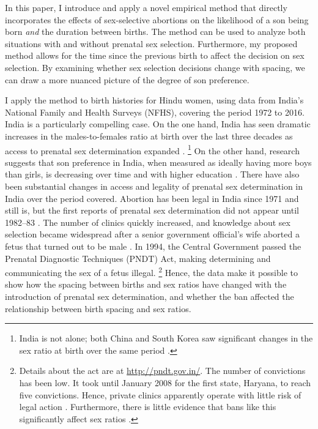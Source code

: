 \documentclass[12pt,letterpaper]{article}
\begin{document}
In this paper, I introduce and apply a novel empirical method that directly incorporates 
the effects of sex-selective abortions on the likelihood of a son being born 
\emph{and} the duration between births.
The method can be used to analyze both situations with and without prenatal
sex selection.
Furthermore, my proposed method allows for the time since the previous 
birth to affect the decision on sex selection.
By examining whether sex selection decisions change with spacing, we can 
draw a more nuanced picture of the degree of son preference.

I apply the method to birth histories for Hindu women, using data from 
India's National Family and Health Surveys (NFHS), covering the period 
1972 to 2016. 
India is a particularly compelling case.
On the one hand, India has seen dramatic increases in the males-to-females ratio 
at birth over the last three decades as access to prenatal sex determination 
expanded 
\citep{das_gupta97,Sudha1999,Arnold2002,retherford03b,jha06}.%
\footnote{
India is not alone; both China and South Korea saw
significant changes in the sex ratio at birth over the same period 
\citep{Yi1993,park95}.
}
On the other hand, research suggests that son preference in 
India, when measured as ideally having more boys than girls, is decreasing 
over time and with higher education \citep{bhat03,pande07}.
There have also been substantial changes in access and legality of
prenatal sex determination in India over the period covered.
Abortion has been legal in India since 1971 and still is, but the 
first reports of prenatal sex determination did
not appear until 1982--83 \citep{Sudha1999,bhat06,Grover2006}.
The number of clinics quickly increased, and knowledge about sex selection 
became widespread after a senior government official's wife aborted a 
fetus that turned out to be male \citep[p.\ 598]{Sudha1999}.
In 1994, the Central Government passed the Prenatal Diagnostic Techniques 
(PNDT) Act, making determining and communicating the sex of a fetus illegal.%
\footnote{
Details about the act are at \href{http://pndt.gov.in/}{http://pndt.gov.in/}.
The number of convictions has been low.
It took until January 2008 for the first state, Haryana, to reach five convictions.
Hence, private clinics apparently operate with little risk of legal action 
\citep{Sudha1999}.
Furthermore, there is little evidence that bans like this significantly
affect sex ratios \citep{Das-Gupta2016}.
}
Hence, the data make it possible to show how the spacing between births and
sex ratios have changed with the introduction of prenatal sex determination,
and whether the ban affected the relationship between birth spacing and sex 
ratios.
\end{document}
